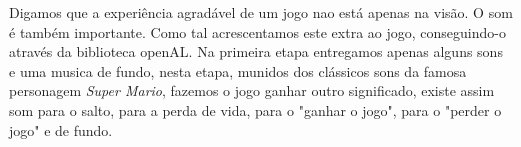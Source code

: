 Digamos que a experiência agradável de um jogo nao está apenas na visão. O som é também importante. Como tal acrescentamos este extra ao jogo, conseguindo-o através da biblioteca openAL. Na primeira etapa entregamos apenas alguns sons e uma musica  de fundo, nesta etapa, munidos dos clássicos sons da famosa personagem \textit{Super Mario}, fazemos o jogo ganhar outro significado, existe assim som para o salto, para a perda de vida, para o "ganhar o jogo", para o "perder o jogo" e de fundo.
